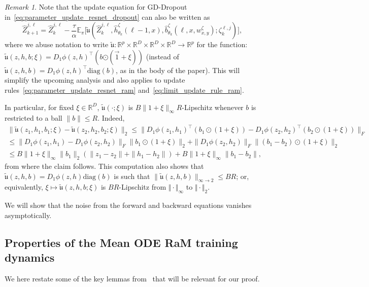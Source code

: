 \documentclass[a4paper,11pt]{article}
\newcommand{\R}{\mathbb{R}}
\newcommand{\1}{\mathbbm{1}}
\newcommand{\E}{\mathbb{E}}
\newcommand{\diag}{\mathrm{diag}}
\theoremstyle{definition}
\theoremstyle{remark}
\newtheorem{rem}{Remark}
\begin{document}
\begin{rem}\label{rem:rewritten_update_map}
    {Note that the update equation for GD-Dropout in~\eqref{eq:parameter_update_resnet_dropout} can also be written as
\begin{equation*}
\hat{Z}_{k+1}^{j,\ell} = \hat{Z}_{k}^{j,\ell} - \frac{\tau}{\alpha}\E_{\pi}\big[\tilde{\mathfrak{u}}(\hat{Z}_{k}^{j,\ell}, \hat{h}_{\theta_k}^{\zeta}(\ell-1, x), \hat{b}_{\theta_k}^{\zeta}(\ell, x, w^{\zeta}_{x,y}); \zeta^{\ell, j}_k)\big],
\end{equation*}
where we abuse notation to write $\tilde{\mathfrak{u}}: \R^p\times\R^D\times\R^{D}\times\R^D \to \R^{p}$ for the function:
$\tilde{\mathfrak{u}}(z, h, b{; \xi}) = D_1\phi(z, h)^\top(b{\odot (\vec{1}+\xi)})$ (instead of $\tilde{\mathfrak{u}}(z, h, b) = D_1\phi(z, h)^\top\diag(b)$, as in the body of the paper). This will simplify the upcoming analysis and also applies to update rules~\eqref{eq:parameter_update_resnet_ram} and~\eqref{eq:limit_update_rule_ram}.
}

{
In particular, for fixed $\xi \in \R^D$, $\tilde{\mathfrak{u}}(\cdot; \xi)$ is $B{\|1+\xi\|_{\infty}}R$-Lipschitz whenever $b$ is restricted to a ball $\|b\|\leq R$. Indeed,
\begin{multline*}
    \|\tilde{\mathfrak{u}}(z_1, h_1, b_1;\xi)-\tilde{\mathfrak{u}}(z_2, h_2, b_2;\xi)\|_2 \leq \|{D_1\phi(z_1, h_1)}^{\top}(b_1\odot(1+\xi)) -{D_1\phi(z_2, h_2)}^{\top}(b_2\odot(1+\xi))\|_F\\
    \leq \|{D_1\phi(z_1, h_1)} -{D_1\phi(z_2, h_2)}\|_F\|b_1\odot(1+\xi)\|_2 + \|{D_1\phi(z_2, h_2)}\|_F\|(b_1-b_2)\odot(1+\xi)\|_2\\
    \leq B\|1+\xi\|_\infty\|b_1\|_2(\|z_1-z_2\| + \|h_1-h_2\|) + B \|1+\xi\|_{\infty}\|b_1-b_2\|,
\end{multline*}
from where the claim follows.
This computation also shows that $\tilde{\mathfrak{u}}(z, h, b) = D_1\phi(z, h)\diag(b)$ is such that $\|\tilde{\mathfrak{u}}(z, h, b)\|_{\infty\to2} \leq BR$; or, equivalently, $\xi \mapsto \tilde{\mathfrak{u}}(z, h, b;\xi)$ is $BR$-Lipschitz from $\Vert\cdot\Vert_\infty$ to $\Vert\cdot\Vert_2$.
}
\end{rem}
 
We will show that the noise from the forward and backward equations vanishes asymptotically.

\subsection{Properties of the Mean ODE RaM training dynamics}\label{app:properties_mean_ode}
We here restate some of the key lemmas from~\cite{chizat2025hidden} that will be relevant for our proof.
\end{document}
